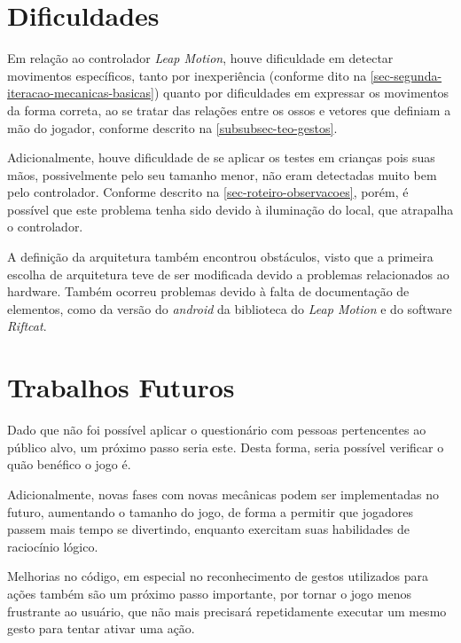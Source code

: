 \section{Dificuldades}\label{sec-conc-dificuldades}

Em relação ao controlador \textit{Leap Motion}, houve dificuldade em detectar
movimentos específicos, tanto por inexperiência (conforme dito na
\autoref{sec-segunda-iteracao-mecanicas-basicas}) quanto por dificuldades 
em expressar os movimentos da forma correta, ao se tratar das relações entre 
os ossos e vetores que definiam a mão do jogador, conforme descrito na
\autoref{subsubsec-teo-gestos}.

Adicionalmente, houve dificuldade de se aplicar os testes em crianças pois
suas mãos, possivelmente pelo seu tamanho menor, não eram detectadas muito 
bem pelo controlador. Conforme descrito na 
\autoref{sec-roteiro-observacoes}, porém, é possível que este problema 
tenha sido devido à iluminação do local, que atrapalha o controlador.

A definição da arquitetura também encontrou obstáculos, visto que a 
primeira escolha de arquitetura teve de ser modificada devido 
a problemas relacionados ao hardware. Também ocorreu problemas devido à falta de documentação de elementos, como da versão do \textit{android} da biblioteca do \textit{Leap Motion} e do software \textit{Riftcat}.



\section{Trabalhos Futuros}\label{sec-conc-trabalhos-futuros}

Dado que não foi possível aplicar o questionário com pessoas pertencentes ao 
público alvo, um próximo passo seria este. Desta forma, seria possível verificar 
o quão benéfico o jogo é.

Adicionalmente, novas fases com novas mecânicas podem ser implementadas no 
futuro, aumentando o tamanho do jogo, de forma a permitir que jogadores 
passem mais tempo se divertindo, enquanto exercitam suas habilidades de 
raciocínio lógico.

Melhorias no código, em especial no reconhecimento de gestos utilizados 
para ações também são um próximo passo importante, por tornar o jogo 
menos frustrante ao usuário, que não mais precisará repetidamente executar 
um mesmo gesto para tentar ativar uma ação.